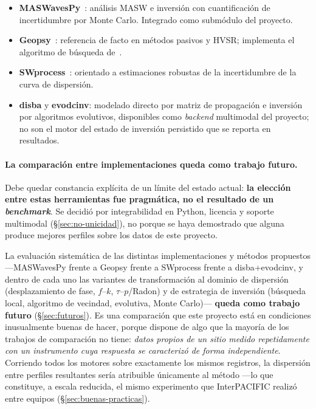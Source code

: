 \begin{itemize}[itemsep=0.15em]
    \item \textbf{MASWavesPy}~\cite{OlafsdottirNGM2024,Olafsdottir2018,Olafsdottir2020}:
    an\'alisis MASW e inversi\'on con cuantificaci\'on de incertidumbre por Monte Carlo.
    Integrado como subm\'odulo del proyecto.
    \item \textbf{Geopsy}~\cite{Wathelet2020}: referencia de facto en m\'etodos pasivos y
    HVSR; implementa el algoritmo de b\'usqueda de~\cite{Wathelet2004}.
    \item \textbf{SWprocess}~\cite{Vantassel2022}: orientado a estimaciones robustas de
    la incertidumbre de la curva de dispersi\'on.
    \item \textbf{disba} y \textbf{evodcinv}: modelado directo por matriz de propagaci\'on
    e inversi\'on por algoritmos evolutivos, disponibles como \emph{backend} multimodal del
    proyecto; no son el motor del estado de inversi\'on persistido que se reporta en
    resultados.
\end{itemize}

\paragraph{La comparaci\'on entre implementaciones queda como trabajo futuro.} Debe
quedar constancia expl\'icita de un l\'imite del estado actual: \textbf{la elecci\'on
entre estas herramientas fue pragm\'atica, no el resultado de un \emph{benchmark}}. Se
decidi\'o por integrabilidad en Python, licencia y soporte multimodal
(\S\ref{sec:no-unicidad}), no porque se haya demostrado que alguna produce mejores
perfiles sobre los datos de este proyecto.

La evaluaci\'on sistem\'atica de las distintas implementaciones y m\'etodos propuestos
---MASWavesPy frente a Geopsy frente a SWprocess frente a disba+evodcinv, y dentro de cada
uno las variantes de transformaci\'on al dominio de dispersi\'on (desplazamiento de fase,
$f$--$k$, $\tau$--$p$/Radon) y de estrategia de inversi\'on (b\'usqueda local, algoritmo de
vecindad, evolutiva, Monte Carlo)--- \textbf{queda como trabajo futuro}
(\S\ref{sec:futuros}). Es una comparaci\'on que este proyecto est\'a en condiciones
inusualmente buenas de hacer, porque dispone de algo que la mayor\'ia de los trabajos de
comparaci\'on no tiene: \emph{datos propios de un sitio medido repetidamente con un
instrumento cuya respuesta se caracteriz\'o de forma independiente}. Corriendo todos los
motores sobre exactamente los mismos registros, la dispersi\'on entre perfiles resultantes
ser\'ia atribuible \'unicamente al m\'etodo ---lo que constituye, a escala reducida, el
mismo experimento que InterPACIFIC realiz\'o entre equipos
(\S\ref{sec:buenas-practicas}).

